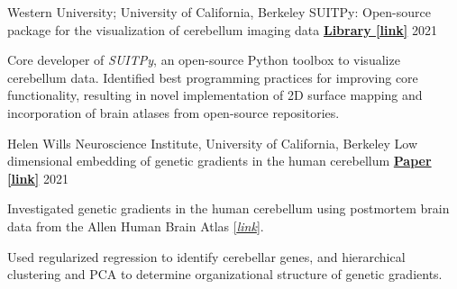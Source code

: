 

\begin{cventries}
    
  \cventry
  	{Western University; University of California, Berkeley}
  	{SUITPy: Open-source package for the visualization of cerebellum imaging data} %
  	{\href{https://suitpy.readthedocs.io/en/latest/}{\textbf{Library [link]}}}
  	{2021} %
    {
      \begin{cvitems} %
      	\item {Core developer of \textit{SUITPy}, an open-source Python toolbox to visualize cerebellum data. Identified best programming practices for improving core functionality, resulting in novel implementation of 2D surface mapping and incorporation of brain atlases from open-source repositories.}
      \end{cvitems}
    }
    
  \cventry
  	{Helen Wills Neuroscience Institute, University of California, Berkeley}
    {Low dimensional embedding of genetic gradients in the human cerebellum} %
    {\href{https://papers.ssrn.com/sol3/papers.cfm?abstract_id=3797269}{\textbf{Paper [link]}}}
    {2021} %
    {
      \begin{cvitems} %
      	\item {Investigated genetic gradients in the human cerebellum using postmortem brain data from the Allen Human Brain Atlas \href{https://human.brain-map.org/}{[\textit{link}}].} 			
      	\item {Used regularized regression to identify cerebellar genes, and hierarchical clustering and PCA to determine organizational structure of genetic gradients.}
      \end{cvitems}
    }
    

\end{cventries}
